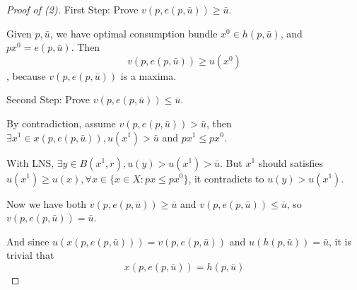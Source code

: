 \begin{proof}[Proof of (2)]
    First Step: Prove $v(p,e(p,\bar{u})) \geq \bar{u}$.

    Given $p,\bar{u}$, we have optimal consumption bundle $x^0 \in h(p,\bar{u})$, and $px^0 = e(p,\bar{u})$. Then \[
        v(p,e(p,\bar{u})) \geq u(x^0)
    \], because $v(p,e(p,\bar{u}))$ is a maxima.

    Second Step: Prove $v(p,e(p,\bar{u})) \leq \bar{u}$.

    By contradiction, assume $v(p,e(p,\bar{u})) > \bar{u}$, then $\exists x^1 \in x(p,e(p,\bar{u})),  u(x^1) > \bar{u}$ and $px^1 \leq px^0$.

    With LNS, $\exists y \in B(x^1,r), u(y) > u(x^1)>\bar{u}$. But $x^1$ should satisfies $u(x^1) \geq u(x), \forall x \in \{x \in X: px \leq px^0\}$, it contradicts to $u(y)>u(x^1)$.

    Now we have both $v(p,e(p,\bar{u})) \geq \bar{u}$ and $v(p,e(p,\bar{u})) \leq \bar{u}$, so $v(p,e(p,\bar{u})) = \bar{u}$.

    And since $u(x(p,e(p,\bar{u}))) = v(p,e(p,\bar{u}))$ and $u(h(p,\bar{u})) = \bar{u}$, it is trivial that \[
        x(p,e(p,\bar{u})) = h(p,\bar{u})
    \]
\end{proof}

